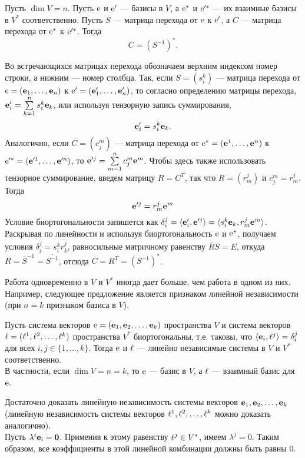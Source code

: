 \begin{predl}\label{p8_4_1}
Пусть $\dim V = n$.  Пусть $\mathrm{e}$ и $\mathrm{e}'$ --- базисы в $V$, 
а $\mathrm{e}^*$ и $\mathrm{e}'^*$ --- их взаимные базисы в $V^{*}$ соответственно.
Пусть $S$ --- матрица перехода от $\mathrm{e}$ к $\mathrm{e}'$, 
а $C$ --- матрица перехода от $\mathrm{e}^*$ к $\mathrm{e}'^*$.
Тогда $$C = ({S}^{-1})^*.$$
\end{predl}
\dok  Во встречающихся матрицах перехода обозначаем верхним индексом номер строки, 
а нижним --- номер столбца. Так, если $S=(s^k_i)$ --- матрица перехода от 
$\mathrm{e} = (\mathbf{e}_1, \ldots , \mathbf{e}_n)$ к 
$\mathrm{e}' = (\mathbf{e}'_1, \ldots , \mathbf{e}'_n)$, то согласно определению матрицы перехода,
$\mathbf{e}'_i = \sum\limits_{k=1}^n s^k_i \mathbf{e}_k$, или используя тензорную запись суммирования, 
$$\mathbf{e}'_i =  s^k_i \mathbf{e}_k.$$
Аналогично, если $C=(c^m_j)$ --- матрица перехода от 
$\mathrm{e}^* = (\mathbf{e}^1, \ldots , \mathbf{e}^n)$ к 
$\mathrm{e}'^* = (\mathbf{e}'^1, \ldots , \mathbf{e}'^n)$, то 
$\mathbf{e}'^j = \sum\limits_{m=1}^n c^m_j \mathbf{e}^m$. Чтобы здесь также 
использовать тензорное суммирование, введем матрицу $R=C^T$, так что $R=(r^j_m)$ и  $c^m_j = r^j_m$.
Тогда 
$$\mathbf{e}'^j =  r^j_m \mathbf{e}^m$$
Условие биортогональности запишется как 
$\delta_i^j = \langle \mathbf{e}'_i, \mathbf{e}'^j  \rangle =    \langle s^k_i \mathbf{e}_k,  r^j_m \mathbf{e}^m \rangle$.
Раскрывая по линейности и используя биортогональность  $\mathrm{e}$ и $\mathrm{e}^*$, 
получаем условия $\delta_i^j =  s^k_i \overline{r^j_k}$, равносильные матричному равенству $\overline{R}S = E$, откуда $R = \overline{S}^{-1} = \overline{S^{-1}}$, 
отсюда $C=R^T =({S}^{-1})^*$.
\edok

\otstup

Работа одновременно в $V$ и $V^*$ иногда дает больше, чем работа в одном из них. 
Например, следующее предложение является признаком линейной независимости (при $n=k$ 
признаком базиса в $V$).


\begin{predl}\label{p8_4_2}
Пусть система векторов $\mathrm{e} = (\mathbf{e}_1, \mathbf{e}_2, \ldots , \mathbf{e}_k)$ пространства
$V$ и система векторов $\mathrm{\ell} = (\mathbf{\ell}^1, \mathbf{\ell}^2, \ldots , \mathbf{\ell}^k)$ пространства
$V^{*}$ %
биортогональны, т.е.  таковы, что
 $\langle \mathbf{e}_i, \mathbf{\ell}^j \rangle = \delta_{i}^j$ для всех $i, j\in \{1, \ldots, k\}$.
Тогда $\mathrm{e}$ и $\mathrm{\ell}$ --- линейно независимые системы в $V$ и $V^*$ соответственно. \\
В частности, если $\dim V = n=k$, то $\mathrm{e}$ --- базис в $V$, а $\mathrm{\ell}$ --- 
взаимный базис для $\mathrm{e}$.
\end{predl}
\dok Достаточно доказать линейную независимость системы векторов $\mathbf{e}_1, \mathbf{e}_2, \ldots , \mathbf{e}_k$
(линейную независимость системы векторов $\mathbf{\ell}^1, \mathbf{\ell}^2, \ldots , \mathbf{\ell}^k$ можно доказать аналогично).\\
Пусть $\lambda^i \mathbf{e}_i=\mathbf{0}$. Применив к этому равенству $\mathbf{\ell}^j\in V^{*}$, имеем
 $\lambda ^j=0$. Таким образом, все коэффициенты в этой линейной комбинации должны быть равны 0.
\edok


